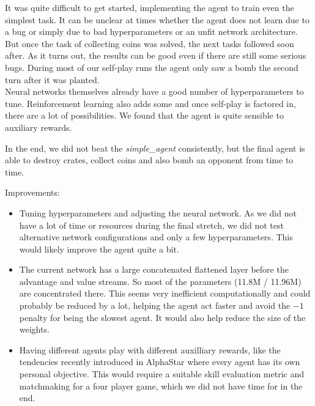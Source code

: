 

It was quite difficult to get started, implementing the agent to train even the simplest task. It can be unclear at times whether the agent does not learn due to a bug or simply due to bad hyperparameters or an unfit network architecture. But once the task of collecting coins was solved, the next tasks followed soon after. As it turns out, the results can be good even if there are still some serious bugs. During most of our self-play runs the agent only saw a bomb the second turn after it was planted.\\
Neural networks themselves already have a good number of hyperparameters to tune. Reinforcement learning also adds some and once self-play is factored in, there are a lot of possibilities. We found that the agent is quite sensible to auxiliary rewards.

In the end, we did not beat the \emph{simple\_agent} consistently, but the final agent is able to destroy crates, collect coins and also bomb an opponent from time to time.


Improvements:
\begin{itemize}
\item{Tuning hyperparameters and adjusting the neural network. As we did not have a lot of time or resources during the final stretch, we did not test alternative network configurations and only a few hyperparameters. This would likely improve the agent quite a bit.}
\item{The current network has a large concatenated flattened layer before the advantage and value streams. So most of the parameters (11.8M / 11.96M) are concentrated there. This seems very inefficient computationally and could probably be reduced by a lot, helping the agent act faster and avoid the $-1$ penalty for being the slowest agent. It would also help reduce the size of the weights.}
\item{Having different agents play with different auxilliary rewards, like the tendencies recently introduced in AlphaStar\cite{alphastarblog} where every agent has its own personal objective. This would require a suitable skill evaluation metric and matchmaking for a four player game, which we did not have time for in the end.}
\end{itemize}

